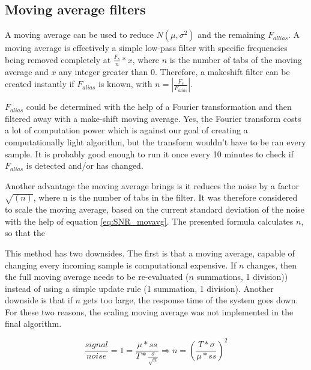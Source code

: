 \subsection{Moving average filters}
A moving average can be used to reduce $N(\mu,\sigma^2)$ and the remaining $F_{allias}$. A moving average is effectively a simple low-pass filter with specific frequencies being removed completely at $\frac{F_s}{n}*x$, where $n$ is the number of tabs of the moving average and $x$ any integer greater than 0. Therefore, a makeshift filter can be created instantly if $F_{alias}$ is known, with $n = \left|\frac{F_{s}}{F_{alias}}\right|$.

$F_{alias}$ could be determined with the help of a Fourier transformation and then filtered away with a make-shift moving average. Yes, the Fourier transform costs a lot of computation power which is against our goal of creating a computationally light algorithm, but the transform wouldn't have to be ran every sample. It is probably good enough to run it once every 10 minutes to check if $F_{alias}$ is detected and/or has changed.

Another advantage the moving average brings is it reduces the noise by a factor $\sqrt{(n)}$, where n is the number of tabs in the filter. It was therefore considered to scale the moving average, based on the current standard deviation of the noise with the help of equation \ref{eq:SNR_movavg}. The presented formula calculates $n$, so that the 

This method has two downsides. The first is that a moving average, capable of changing every incoming sample is computational expensive. If $n$ changes, then the full moving average needs to be re-evaluated ($n$ summations, 1 division)) instead of using a simple update rule (1 summation, 1 division). Another downside is that if $n$ gets too large, the response time of the system goes down. For these two reasons, the scaling moving average was not implemented in the final algorithm.

\begin{equation}
\label{eq:SNR_movavg}
\frac{signal}{noise} = 1 = \frac{\mu * ss}{T * \frac{\sigma}{\sqrt{n}}} \Rightarrow n = \left(\frac{T * \sigma}{\mu*ss}\right)^2
\end{equation}


